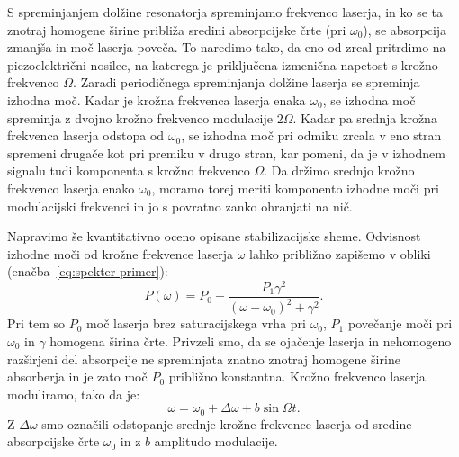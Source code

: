 S spreminjanjem dolžine resonatorja spreminjamo frekvenco laserja, in 
ko se ta znotraj homogene širine približa sredini absorpcijske črte (pri $\omega_0$), 
se absorpcija zmanjša in moč laserja poveča. To naredimo tako, da  
eno od zrcal pritrdimo na piezoelektrični nosilec, na katerega je priključena
izmenična napetost s krožno frekvenco $\Omega$. Zaradi periodičnega spreminjanja dolžine
laserja se spreminja izhodna moč. Kadar je krožna frekvenca laserja 
enaka $\omega_0$, se izhodna 
moč spreminja z dvojno krožno frekvenco modulacije $2\Omega$. 
Kadar pa srednja krožna frekvenca laserja odstopa od $\omega_0$, se izhodna moč 
pri odmiku zrcala v eno stran spremeni drugače kot pri premiku v drugo stran, 
kar pomeni, da je v izhodnem signalu tudi komponenta 
s krožno frekvenco $\Omega$. Da držimo 
srednjo krožno frekvenco laserja enako $\omega_0$, moramo torej meriti komponento 
izhodne moči pri modulacijski frekvenci in jo s povratno zanko ohranjati na nič.

Napravimo še kvantitativno oceno opisane stabilizacijske sheme. Odvisnost
izhodne moči od krožne frekvence laserja $\omega$ lahko približno zapišemo v
obliki (enačba~\ref{eq:spekter-primer}):
\begin{equation}  
\label{5.40}
P(\omega)=P_0 + \frac{P_1\gamma^2}{(\omega- \omega_0)^2+\gamma^2}.
\end{equation}
Pri tem so $P_0$ moč laserja brez saturacijskega vrha pri $\omega_0$, $P_1$ 
povečanje moči pri $\omega_0$ in $\gamma$ homogena širina črte. 
Privzeli  
smo, da se ojačenje laserja in nehomogeno razširjeni del absorpcije ne 
spreminjata znatno znotraj homogene širine absorberja in je zato moč $P_0$ 
približno konstantna. Krožno frekvenco laserja moduliramo, tako da je:
\begin{equation}  
\label{5.41}
\omega=\omega_0+\Delta\omega+b \sin \Omega t.
\end{equation}
Z $\Delta\omega$ smo označili odstopanje srednje krožne frekvence laserja od
sredine absorpcijske črte $\omega_0$ in z $b$ amplitudo modulacije. 

